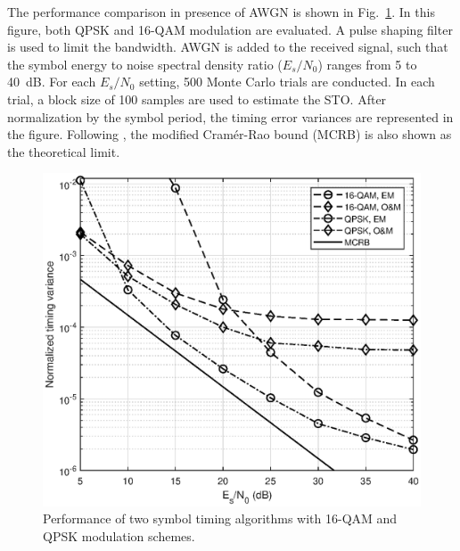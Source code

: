 \documentclass[12pt, draftclsnofoot, onecolumn]{IEEEtran}
\begin{document}
The performance comparison in presence of AWGN is shown in Fig.~\ref{fig:timing_per}.
In this figure, both QPSK and 16-QAM modulation are evaluated.
A pulse shaping filter is used to limit the bandwidth.
AWGN is added to the received signal, such that the symbol energy to noise spectral density ratio (\(E_s/N_0\)) ranges from 5 to 40~dB. 
For each \(E_s/N_0\) setting, 500 Monte Carlo trials are conducted.
In each trial, a block size of 100 samples are used to estimate the STO.
After normalization by the symbol period, the timing error variances are represented in the figure.
Following \cite{mengali1997synchronization}, the modified Cram\'er-Rao bound (MCRB) is also shown as the theoretical limit.

\begin{figure}[ht]
\centering
\includegraphics[width=3.1 in]{pic/per_timing-k.eps}
\caption{Performance of two symbol timing algorithms with 16-QAM and QPSK modulation schemes.}
\label{fig:timing_per} 
\end{figure}   
\end{document}

